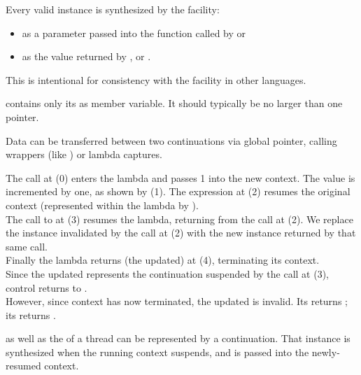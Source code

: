 \newpage
{}\label{design}


Every valid \cont instance is synthesized by the \callcc facility:
\begin{itemize}
    \item as a parameter passed into the function called by \callcc or \resumewith
    \item as the value returned by \callcc, \resume or \resumewith.
\end{itemize}

This is intentional for consistency with the \cc facility in other
languages.\cite{schemecallcc}\citecomma\cite{rubycallcc}



\cont contains only its  as member variable. It should
typically be no larger than one pointer.


\label{subsec:data}

Data can be transferred between two continuations via global pointer, calling
wrappers (like ) or lambda captures.

The  call at (0) enters the lambda and passes 1 into the
new context. The value is incremented by one, as shown by (1). The expression
 at (2) resumes the original context (represented
within the lambda by ).\\
The call to  at (3) resumes the lambda, returning from the
 call at (2). We replace the \cont instance 
invalidated by the \resume call at (2) with the new instance returned by that
same \resume call.\\
Finally the lambda returns (the updated)  at (4), terminating its
context.\\

Since the updated  represents the continuation suspended by the call at
(3), control returns to \main.\\

However, since context  has now terminated, the updated  is
invalid. Its \opbool returns ; its  returns
.


\label{subsec:main}

\main as well as the \entryfn of a thread can be represented by a continuation.
That \cont instance is synthesized when the running context suspends, and is
passed into the newly-resumed context.

